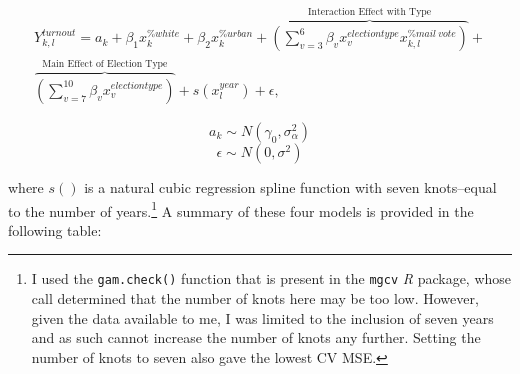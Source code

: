 \documentclass[12pt,twoside]{reedthesis}
\begin{document}
  \begin{multline}\tag{Model 4}
  Y^{turnout}_{k,l} = a_{k} + \beta_{1}x_k^{\% white} + \beta_{2}x_k^{\% urban} + \overbrace{(\sum_{v=3}^{6}\beta_{v}x_{v}^{election type} x_{k,l}^{\% mail~vote})}^\text{Interaction Effect with Type} + \\ \overbrace{(\sum_{v=7}^{10}\beta_{v}x_{v}^{election type})}^\text{Main Effect of Election Type} + s(x^{year}_{l}) + \epsilon,
  \end{multline}
  
  \[a_{k} \sim N(\gamma_0, \sigma_{\alpha}^2)\]
  \[\epsilon \sim N(0, \sigma^2)\]
  
  where \(s()\) is a natural cubic regression spline function with seven
  knots--equal to the number of years.\footnote{I used the
    \texttt{gam.check()} function that is present in the \texttt{mgcv}
    \textit{R} package, whose call determined that the number of knots
    here may be too low. However, given the data available to me, I was
    limited to the inclusion of seven years and as such cannot increase
    the number of knots any further. Setting the number of knots to seven
    also gave the lowest CV MSE.} A summary of these four models is
  provided in the following table:
  
\end{document}
